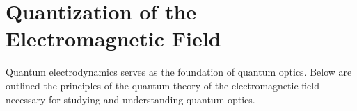 \chapter{Quantization of the Electromagnetic Field} 
\label{chQuantel}

Quantum electrodynamics serves as the foundation of quantum optics. Below are outlined the principles of the quantum theory of the electromagnetic field necessary for studying and understanding quantum optics.















